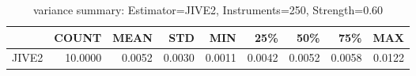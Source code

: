 \begin{table}[ht]
\centering
\caption{variance summary: Estimator=JIVE2, Instruments=250, Strength=0.60}
\begin{tabular}{lrrrrrrrr}
\toprule
 & COUNT & MEAN & STD & MIN & 25\% & 50\% & 75\% & MAX \\
\midrule
JIVE2 & 10.0000 & 0.0052 & 0.0030 & 0.0011 & 0.0042 & 0.0052 & 0.0058 & 0.0122 \\
\bottomrule
\end{tabular}
\end{table}

